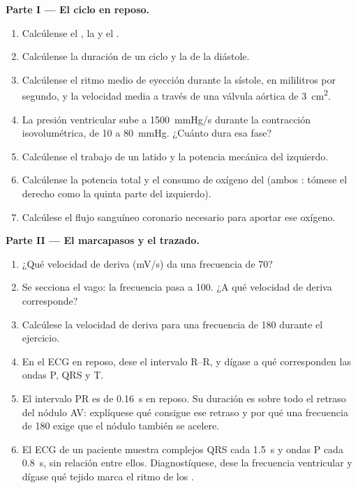 \begin{problem}
\medskip
\noindent\textbf{Parte I --- El ciclo en reposo.}
\begin{enumerate}
  \item Calcúlense el , la  y el .
  \item Calcúlense la duración de un ciclo y la de la diástole.
  \item Calcúlense el ritmo medio de eyección durante la sístole, en
        mililitros por segundo, y la velocidad media a través de una
        válvula aórtica de \qty{3}{cm^2}.
  \item La presión ventricular sube a \qty{1500}{mmHg/s} durante la
        contracción isovolumétrica, de 10 a \qty{80}{mmHg}. ¿Cuánto dura
        esa fase?
  \item Calcúlense el trabajo de un latido y la potencia mecánica del
         izquierdo.
  \item Calcúlense la potencia total y el consumo de oxígeno del 
        (ambos : tómese el derecho como la quinta parte del
        izquierdo).
  \item Calcúlese el flujo sanguíneo coronario necesario para aportar ese
        oxígeno.
\end{enumerate}

\medskip
\noindent\textbf{Parte II --- El marcapasos y el trazado.}
\begin{enumerate}[resume]
  \item ¿Qué velocidad de deriva (\unit{mV/s}) da una frecuencia de 70?
  \item Se secciona el vago: la frecuencia pasa a 100. ¿A qué velocidad de
        deriva corresponde?
  \item Calcúlese la velocidad de deriva para una frecuencia de 180
        durante el ejercicio.
  \item En el ECG en reposo, dese el intervalo R--R, y dígase a qué
        corresponden las ondas P, QRS y T.
  \item El intervalo PR es de \qty{0.16}{s} en reposo. Su duración es
        sobre todo el retraso del nódulo AV: explíquese qué consigue ese
        retraso y por qué una frecuencia de 180 exige que el nódulo también
        se acelere.
  \item El ECG de un paciente muestra complejos QRS cada \qty{1.5}{s} y
        ondas P cada \qty{0.8}{s}, sin relación entre ellos. Diagnostíquese,
        dese la frecuencia ventricular y dígase qué tejido marca el ritmo de
        los .
\end{enumerate}


\end{problem}
